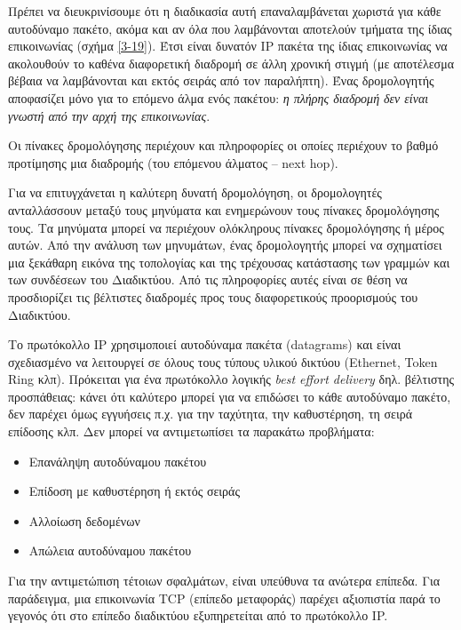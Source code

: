 Πρέπει να διευκρινίσουμε ότι η διαδικασία αυτή επαναλαμβάνεται χωριστά για κάθε αυτοδύναμο πακέτο, ακόμα και αν όλα που λαμβάνονται αποτελούν τμήματα της ίδιας επικοινωνίας (σχήμα \ref{3-19}). Έτσι είναι δυνατόν IP πακέτα της ίδιας επικοινωνίας να ακολουθούν το καθένα διαφορετική διαδρομή σε άλλη χρονική στιγμή (με αποτέλεσμα βέβαια να λαμβάνονται και εκτός σειράς από τον παραλήπτη). Ένας δρομολογητής αποφασίζει μόνο για το επόμενο άλμα ενός πακέτου: \emph{η πλήρης διαδρομή δεν είναι γνωστή από την αρχή της επικοινωνίας}.

Οι πίνακες δρομολόγησης περιέχουν και πληροφορίες οι οποίες περιέχουν το βαθμό προτίμησης μια διαδρομής (του επόμενου άλματος -- next hop).

Για να επιτυγχάνεται η καλύτερη δυνατή δρομολόγηση, οι δρομολογητές ανταλλάσσουν μεταξύ τους μηνύματα και ενημερώνουν τους πίνακες δρομολόγησης τους.  Τα μηνύματα μπορεί να περιέχουν ολόκληρους πίνακες δρομολόγησης ή μέρος αυτών. Από την ανάλυση των μηνυμάτων, ένας δρομολογητής μπορεί να σχηματίσει μια ξεκάθαρη εικόνα της τοπολογίας και της τρέχουσας κατάστασης των γραμμών και των συνδέσεων του Διαδικτύου. Από τις πληροφορίες αυτές είναι σε θέση να προσδιορίζει τις βέλτιστες διαδρομές προς τους διαφορετικούς προορισμούς του Διαδικτύου.

Το πρωτόκολλο IP χρησιμοποιεί αυτοδύναμα πακέτα (datagrams) και είναι σχεδιασμένο να λειτουργεί σε όλους τους τύπους υλικού δικτύου (Ethernet, Token Ring κλπ). Πρόκειται για ένα πρωτόκολλο λογικής \emph{best effort delivery} δηλ. βέλτιστης προσπάθειας:  κάνει ότι καλύτερο μπορεί για να επιδώσει το κάθε αυτοδύναμο πακέτο, δεν παρέχει όμως εγγυήσεις π.χ. για την ταχύτητα, την καθυστέρηση, τη σειρά επίδοσης κλπ. Δεν μπορεί να αντιμετωπίσει τα παρακάτω προβλήματα:

\begin{itemize}
\item Επανάληψη αυτοδύναμου πακέτου
\item Επίδοση με καθυστέρηση ή εκτός σειράς
\item Αλλοίωση δεδομένων
\item Απώλεια αυτοδύναμου πακέτου
\end{itemize}

Για την αντιμετώπιση τέτοιων σφαλμάτων, είναι υπεύθυνα τα ανώτερα επίπεδα. Για παράδειγμα, μια επικοινωνία TCP (επίπεδο μεταφοράς) παρέχει αξιοπιστία παρά το γεγονός ότι στο επίπεδο διαδικτύου εξυπηρετείται από το πρωτόκολλο IP.

 
